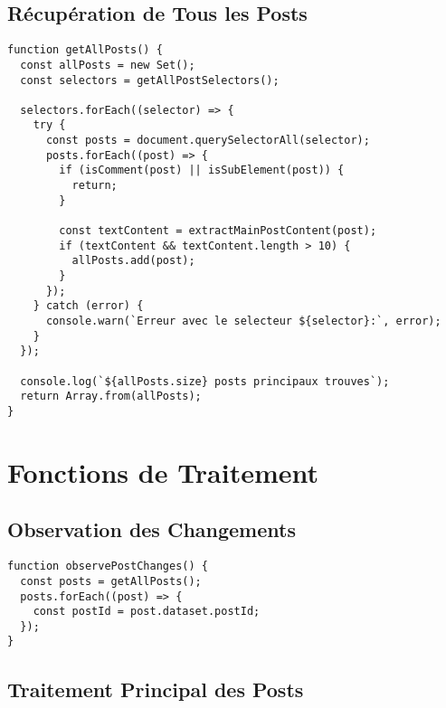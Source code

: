 \documentclass[12pt,a4paper]{article}
\begin{document}
\subsection{Récupération de Tous les Posts}

\begin{lstlisting}
function getAllPosts() {
  const allPosts = new Set();
  const selectors = getAllPostSelectors();

  selectors.forEach((selector) => {
    try {
      const posts = document.querySelectorAll(selector);
      posts.forEach((post) => {
        if (isComment(post) || isSubElement(post)) {
          return;
        }

        const textContent = extractMainPostContent(post);
        if (textContent && textContent.length > 10) {
          allPosts.add(post);
        }
      });
    } catch (error) {
      console.warn(`Erreur avec le selecteur ${selector}:`, error);
    }
  });

  console.log(`${allPosts.size} posts principaux trouves`);
  return Array.from(allPosts);
}
\end{lstlisting}

\section{Fonctions de Traitement}

\subsection{Observation des Changements}

\begin{lstlisting}
function observePostChanges() {
  const posts = getAllPosts();
  posts.forEach((post) => {
    const postId = post.dataset.postId;
  });
}
\end{lstlisting}

\subsection{Traitement Principal des Posts}
\end{document}

